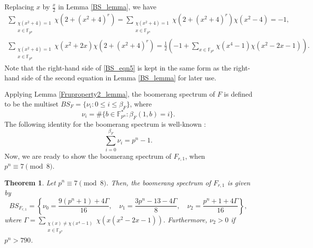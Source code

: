 \documentclass[11pt]{article}
\newtheorem{theorem}{Theorem}[section]
\numberwithin{theorem}{section}
\newcommand{\Sum}{\displaystyle \sum}
\newcommand{\Fpn}{\mathbb{F}_{p^n}}
\newcommand{\Fpnmul}{\mathbb{F}_{p^n}^*}
\begin{document}
Replacing $x$ by $\frac{x}{2}$ in Lemma \ref{BS_lemma}, we have
\begin{align}
	\Sum_{\substack{\chi(x^2+4)=1\\ x\in \Fpn}}\chi(2+(x^2+4)^r) = \Sum_{\substack{\chi(x^2+4)=1\\ x\in \Fpn}}\chi(2+(x^2+4)^r)\chi(x^2-4) = -1, \label{BS_eqn4}\\
	\Sum_{\substack{\chi(x^2+4)=1\\ x\in \Fpn}}\chi(x^2+2x)\chi(2+(x^2+4)^r) = \frac{1}{2}\left( -1+\Sum_{x\in \Fpn}\chi(x^4-1)\chi(x^2-2x-1)\right).  \label{BS_eqn5}
\end{align}
Note that the right-hand side of \eqref{BS_eqn5} is kept in the same form as the right-hand side of the second equation in Lemma \ref{BS_lemma} for later use.

Applying Lemma \ref{Fruproperty2_lemma}, the boomerang spectrum of $F$ is defined to be the multiset $BS_F=\{\nu_i : 0 \le i \le \beta_F\}$, where
\begin{equation*}
	\nu_i = \#\{ b\in \Fpnmul : \beta_F(1,b)=i\}.
\end{equation*}
The following identity for the boomerang spectrum is well-known :
\begin{equation}\label{BS_identity}
	\sum_{i=0}^{\beta_F}\nu_i = p^n-1.
\end{equation}
Now, we are ready to show the boomerang spectrum of $F_{r,1}$, when $p^n \equiv 7 \pmod{8}$.

\begin{theorem}\label{BS_thm}
	Let $p^n \equiv 7 \pmod{8}$. Then, the boomerang spectrum of $F_{r,1}$ is given by 
	\begin{equation*}
		BS_{F_{r,1}} = \left\{ 
		\nu_0 =  \frac{9(p^n+1)+4\Gamma}{16},\quad
		\nu_1 =  \frac{3p^n-13-4\Gamma}{8},\quad 
		\nu_2 =  \frac{p^n+1+4\Gamma}{16} 
		\right\},
	\end{equation*}
	where $\Gamma = \Sum_{\substack{\chi(x)\ne\chi(x^4-1)\\ x\in \Fpn}}\chi(x(x^2-2x-1))$. Furthermore, $\nu_2 > 0$ if $p^n > 790$.
\end{theorem}
\end{document}
